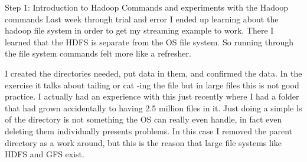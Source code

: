 \documentclass[10pt]{article}
\begin{document}
Step 1: Introduction to Hadoop Commands and experiments with the Hadoop commands 
Last week through trial and error I ended up learning about the hadoop file system in order to get my streaming example to work. There I learned that the HDFS is separate from the OS file system. So running through the file system commands felt more like a refresher. 
  
I created the directories needed, put data in them, and confirmed the data. In the exercise it talks about tailing or cat -ing the file but in large files this is not good practice. I actually had an experience with this just recently where I had a folder that had grown accidentally to having 2.5 million files in it. Just doing a simple ls of the directory is not something the OS can really even handle, in fact even deleting them individually presents problems. In this case I removed the parent directory as a work around, but this is the reason that large file systems like HDFS and GFS exist.  
\end{document}
